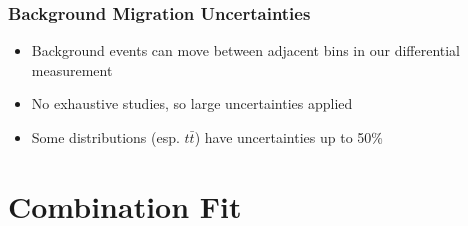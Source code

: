 \documentclass{beamer}
\begin{document}
\begin{frame}
  \frametitle{Background Migration Uncertainties}

  \begin{itemize}
  \item Background events can move between adjacent bins in our differential measurement
  \item No exhaustive studies, so large uncertainties applied
  \item Some distributions (esp. $t\bar{t}$) have uncertainties up to 50\%
  \end{itemize}

\end{frame}

\section{Combination Fit}
\end{document}
